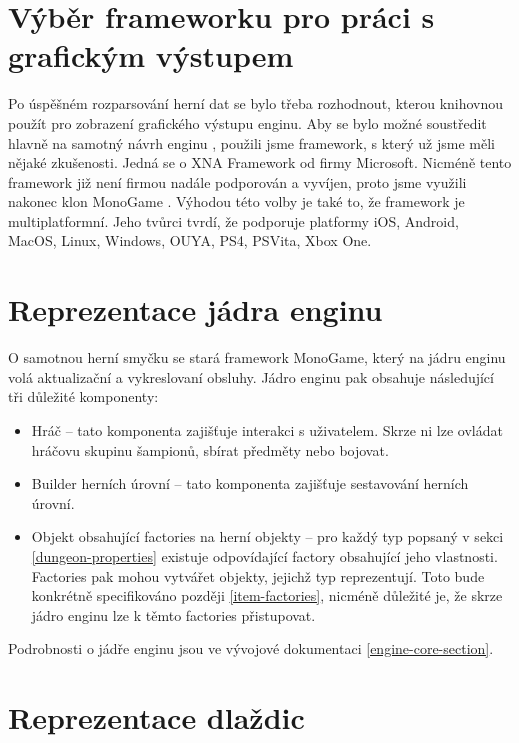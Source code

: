 
\section{Výběr frameworku pro práci s grafickým výstupem}

Po úspěšném rozparsování herní dat se bylo třeba rozhodnout, kterou knihovnou použít pro zobrazení grafického výstupu enginu. 
Aby se bylo možné soustředit hlavně na samotný návrh enginu , použili jsme framework, s který už jsme měli nějaké zkušenosti.
Jedná se o XNA Framework od firmy Microsoft. Nicméně tento framework již není firmou nadále podporován a vyvíjen, proto jsme využili 
nakonec klon MonoGame \cite{MonoGame}. Výhodou této volby je také to, že framework je multiplatformní. Jeho tvůrci tvrdí, že podporuje platformy
iOS, Android, MacOS, Linux, Windows, OUYA, PS4, PSVita, Xbox One.

\section{Reprezentace jádra enginu}\label{engine-core-section}

O samotnou herní smyčku se stará framework MonoGame, který na jádru enginu volá aktualizační a vykreslovaní obsluhy.
Jádro enginu pak obsahuje následující tři důležité komponenty:
\begin{itemize}
\item Hráč -- tato komponenta zajišťuje interakci s uživatelem. Skrze ni lze ovládat hráčovu skupinu šampionů, sbírat předměty nebo bojovat.
\item Builder herních úrovní -- tato komponenta zajišťuje sestavování herních úrovní.
\item Objekt obsahující factories na herní objekty -- pro každý typ popsaný v sekci \ref{dungeon-properties} existuje odpovídající
	factory obsahující jeho vlastnosti. Factories pak mohou vytvářet objekty, jejichž typ reprezentují. Toto bude konkrétně
	specifikováno později \vref{item-factories}, nicméně důležité je, že skrze jádro enginu lze k těmto factories přistupovat.
\end{itemize}
Podrobnosti o jádře enginu jsou ve vývojové dokumentaci \vref{engine-core-section}.

\section{Reprezentace dlaždic}\label{tile-representation}


